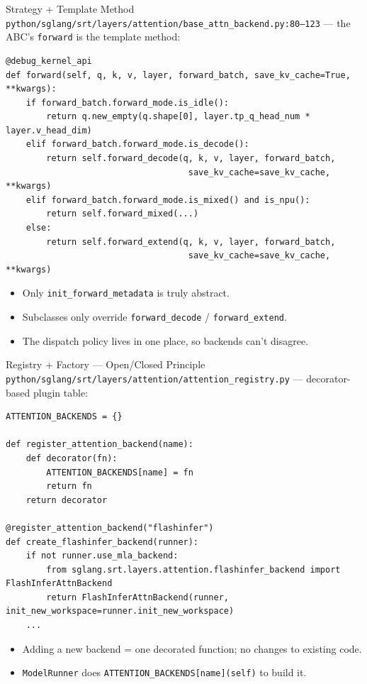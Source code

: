 \documentclass[aspectratio=169,10pt]{beamer}
\begin{document}
\begin{frame}[fragile]{Strategy + Template Method}
  \footnotesize
  \texttt{python/sglang/srt/layers/attention/base\_attn\_backend.py:80--123} --- the ABC's \texttt{forward} is the template method:
\begin{lstlisting}
@debug_kernel_api
def forward(self, q, k, v, layer, forward_batch, save_kv_cache=True, **kwargs):
    if forward_batch.forward_mode.is_idle():
        return q.new_empty(q.shape[0], layer.tp_q_head_num * layer.v_head_dim)
    elif forward_batch.forward_mode.is_decode():
        return self.forward_decode(q, k, v, layer, forward_batch,
                                    save_kv_cache=save_kv_cache, **kwargs)
    elif forward_batch.forward_mode.is_mixed() and is_npu():
        return self.forward_mixed(...)
    else:
        return self.forward_extend(q, k, v, layer, forward_batch,
                                    save_kv_cache=save_kv_cache, **kwargs)
\end{lstlisting}
  \vspace{-0.2cm}
  \begin{itemize}\scriptsize
    \item Only \texttt{init\_forward\_metadata} is truly abstract.
    \item Subclasses only override \texttt{forward\_decode} / \texttt{forward\_extend}.
    \item The dispatch policy lives in one place, so backends can't disagree.
  \end{itemize}
\end{frame}

\begin{frame}[fragile]{Registry + Factory --- Open/Closed Principle}
  \footnotesize
  \texttt{python/sglang/srt/layers/attention/attention\_registry.py} --- decorator-based plugin table:
\begin{lstlisting}
ATTENTION_BACKENDS = {}

def register_attention_backend(name):
    def decorator(fn):
        ATTENTION_BACKENDS[name] = fn
        return fn
    return decorator

@register_attention_backend("flashinfer")
def create_flashinfer_backend(runner):
    if not runner.use_mla_backend:
        from sglang.srt.layers.attention.flashinfer_backend import FlashInferAttnBackend
        return FlashInferAttnBackend(runner, init_new_workspace=runner.init_new_workspace)
    ...
\end{lstlisting}
  \begin{itemize}\scriptsize
    \item Adding a new backend = one decorated function; no changes to existing code.
    \item \texttt{ModelRunner} does \texttt{ATTENTION\_BACKENDS[name](self)} to build it.
  \end{itemize}
\end{frame}
\end{document}
